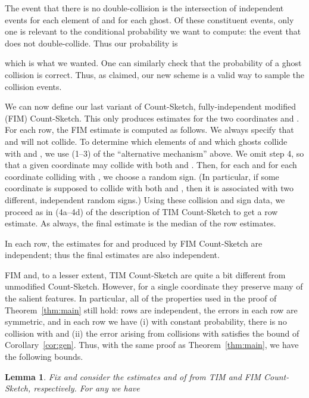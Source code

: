 \documentclass[letterpaper,11pt]{article}
\newtheorem{lemma}[theorem]{Lemma}
\begin{document}
The event that there is no double-collision is the intersection
of independent events for each element of 
and for each ghost.  Of these constituent events, only one is relevant
to the conditional probability we want to compute: the event that 
does not double-collide.  Thus our probability is

which is what we wanted.
One can similarly check that the probability of a ghost
collision is correct.  Thus, as claimed, our new scheme is
a valid way to sample the collision events.

We can now define our last variant of Count-Sketch,
fully-independent modified (FIM) Count-Sketch.  This only produces estimates for the two
coordinates  and .   For each row, the FIM
estimate is computed as follows.  We always specify
that  and  will not collide.
To determine which elements of 
and which ghosts collide with  and , we use
(1--3) of the ``alternative mechanism'' above.  We
omit step 4, so that a given coordinate may collide
with both  and .  Then, for each 
and for each coordinate colliding with , we choose a
random sign.  (In particular, if some coordinate is supposed to
collide with both  and , then it is associated with
two different, independent random signs.)  Using
these collision and sign data, we proceed
as in (4a--4d) of the description of TIM
Count-Sketch to get a row estimate.  As always, the final estimate is the median
of the row estimates.

In each row, the estimates for  and  produced
by FIM Count-Sketch are independent; thus the final
estimates are also independent.

FIM and, to a lesser extent, TIM Count-Sketch are quite a bit different
from unmodified Count-Sketch.
However, for a single coordinate they preserve many of the salient features.
In particular, all of the properties used in the proof of Theorem~\ref{thm:main}
still hold: rows are independent, the errors in each row are symmetric, and
in each row we have (i) with constant probability, there is no collision with
 and (ii) the error arising from collisions with  satisfies
the bound of Corollary~\ref{cor:gen}.  Thus, with the same proof as Theorem~\ref{thm:main},
we have the following bounds.

\begin{lemma} \label{lma:fimbound}
Fix  and consider the estimates 
and  of  from
TIM and FIM Count-Sketch, respectively.  For any  we have
 
\end{lemma}
\end{document}
